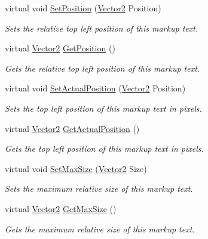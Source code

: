\begin{DoxyCompactItemize}
virtual void \hyperlink{classphys_1_1UI_1_1MarkupText_ab78ebccb8ab629ef1858cf48f8b505a0}{SetPosition} (\hyperlink{classphys_1_1Vector2}{Vector2} Position)
\begin{DoxyCompactList}\small\item\em Sets the relative top left position of this markup text. \item\end{DoxyCompactList}\item 
virtual \hyperlink{classphys_1_1Vector2}{Vector2} \hyperlink{classphys_1_1UI_1_1MarkupText_a9d92f03e1cad181a5d8f20f3f95cf7cc}{GetPosition} ()
\begin{DoxyCompactList}\small\item\em Gets the relative top left position of this markup text. \item\end{DoxyCompactList}\item 
virtual void \hyperlink{classphys_1_1UI_1_1MarkupText_a95ce98aec4946447e5da951911bfe628}{SetActualPosition} (\hyperlink{classphys_1_1Vector2}{Vector2} Position)
\begin{DoxyCompactList}\small\item\em Sets the top left position of this markup text in pixels. \item\end{DoxyCompactList}\item 
virtual \hyperlink{classphys_1_1Vector2}{Vector2} \hyperlink{classphys_1_1UI_1_1MarkupText_a1e5bfba8d1686cb4188793fd695c7090}{GetActualPosition} ()
\begin{DoxyCompactList}\small\item\em Gets the top left position of this markup text in pixels. \item\end{DoxyCompactList}\item 
virtual void \hyperlink{classphys_1_1UI_1_1MarkupText_a4e7ebb993d6c553a3734efc5cae896f3}{SetMaxSize} (\hyperlink{classphys_1_1Vector2}{Vector2} Size)
\begin{DoxyCompactList}\small\item\em Sets the maximum relative size of this markup text. \item\end{DoxyCompactList}\item 
virtual \hyperlink{classphys_1_1Vector2}{Vector2} \hyperlink{classphys_1_1UI_1_1MarkupText_ae68fd261f2dc9494a16e3089c7a35b8a}{GetMaxSize} ()
\begin{DoxyCompactList}\small\item\em Gets the maximum relative size of this markup text. \item\end{DoxyCompactList}\item 

\end{DoxyCompactItemize}
